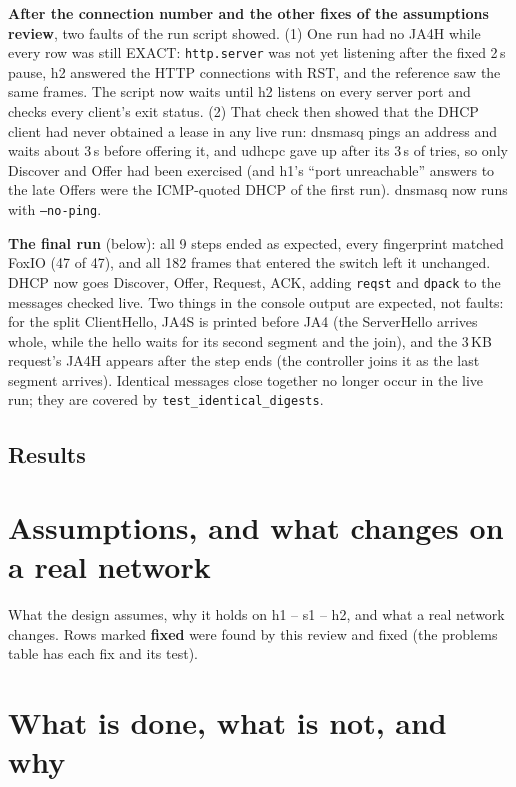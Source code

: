 \documentclass[11pt,a4paper]{article}
\newcommand{\code}[1]{\texttt{#1}}
\begin{document}
\textbf{After the connection number and the other fixes of the assumptions review}, two faults of the run script
showed. (1) One run had no JA4H while every row was still EXACT: \code{http.server} was not yet listening after the
fixed 2\,s pause, h2 answered the HTTP connections with RST, and the reference saw the same frames. The script now
waits until h2 listens on every server port and checks every client's exit status. (2) That check then showed that
the DHCP client had never obtained a lease in any live run: dnsmasq pings an address and waits about 3\,s before
offering it, and udhcpc gave up after its 3\,s of tries, so only Discover and Offer had been exercised (and h1's
``port unreachable'' answers to the late Offers were the ICMP-quoted DHCP of the first run). dnsmasq now runs with
\code{--no-ping}.

\textbf{The final run} (below): all 9 steps ended as expected, every fingerprint matched FoxIO (47 of 47), and all
182 frames that entered the switch left it unchanged. DHCP now goes Discover, Offer, Request, ACK, adding
\code{reqst} and \code{dpack} to the messages checked live. Two things in the console output are expected, not
faults: for the split ClientHello, JA4S is printed before JA4 (the ServerHello arrives whole, while the hello waits
for its second segment and the join), and the 3\,KB request's JA4H appears after the step ends (the controller joins
it as the last segment arrives). Identical messages close together no longer occur in the live run; they are
covered by \code{test\_identical\_digests}.

\subsection*{Results}


\section{Assumptions, and what changes on a real network}
\label{sec:assumptions}

What the design assumes, why it holds on h1 -- s1 -- h2, and what a real network changes. Rows marked
\textbf{fixed} were found by this review and fixed (the problems table has each fix and its test).



\section{What is done, what is not, and why}
\label{sec:coverage}

\end{document}
